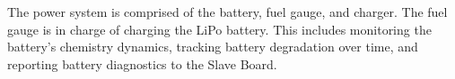 









The power system is comprised of the battery, fuel gauge, and charger.  The fuel gauge is in charge of charging the LiPo battery. This includes monitoring the battery's chemistry dynamics, tracking battery degradation over time, and reporting battery diagnostics to the Slave Board. 

